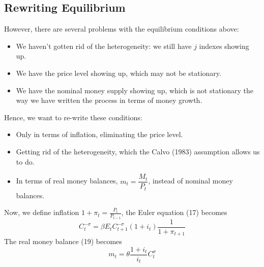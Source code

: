 \documentclass[twocolumn, fleqn]{article}
\begin{document}
	\subsection{Rewriting Equilibrium}
	However, there are several problems with the equilibrium conditions above:
	\begin{itemize}
        \item We haven't gotten rid of the heterogeneity: we still have $j$ indexes showing up.
        \item We have the price level showing up, which may not be stationary.
        \item We have the nominal money supply showing up, which is not stationary the way we have written the process in terms of money growth.
    \end{itemize}

    Hence, we want to re-write these conditions:
    \begin{itemize}
        \item Only in terms of inflation, eliminating the price level.
        \item Getting rid of the heterogeneity, which the Calvo (1983) assumption allows us to do.
        \item In terms of real money balances, $m_t = \dfrac{M_t}{P_t}$, instead of nominal money balances.
    \end{itemize}
    
    Now, we define inflation $1+\pi_t = \frac{P_{t}}{P_{t-1}}$, the Euler equation (17) becomes 
    \begin{equation}
    	 C_t^{-\sigma} = \beta E_t C_{t+1}^{-\sigma} (1 + i_t) \dfrac{1}{1 + \pi_{t+1}}
    \end{equation}
	The real money balance (19) becomes 
	\begin{equation}
		m_t = \theta{\frac{1 + i_t}{i_t}} C_t^\sigma
	\end{equation}
	
\end{document}

